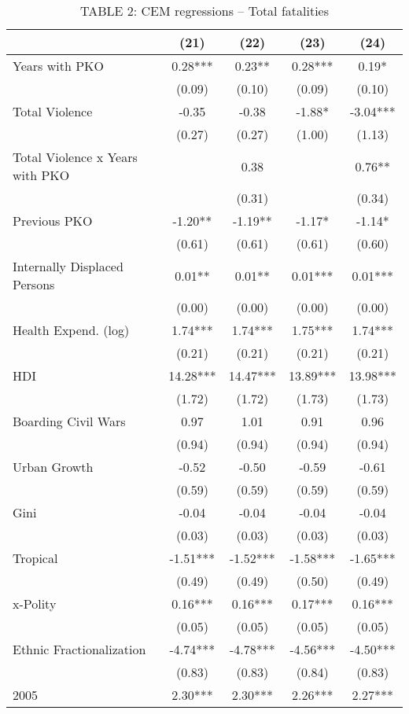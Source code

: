 \begin{table}

\caption{TABLE 2: CEM regressions – Total fatalities}
\centering
\begin{tabular}[t]{lcccc}
\toprule
  & (21) & (22) & (23) & (24)\\
\midrule
Years with PKO & 0.28*** & 0.23** & 0.28*** & 0.19*\\
 & (0.09) & (0.10) & (0.09) & (0.10)\\
Total Violence & -0.35 & -0.38 & -1.88* & -3.04***\\
 & (0.27) & (0.27) & (1.00) & (1.13)\\
Total Violence x Years with PKO &  & 0.38 &  & 0.76**\\
 &  & (0.31) &  & (0.34)\\
Previous PKO & -1.20** & -1.19** & -1.17* & -1.14*\\
 & (0.61) & (0.61) & (0.61) & (0.60)\\
Internally Displaced Persons & 0.01** & 0.01** & 0.01*** & 0.01***\\
 & (0.00) & (0.00) & (0.00) & (0.00)\\
Health Expend. (log) & 1.74*** & 1.74*** & 1.75*** & 1.74***\\
 & (0.21) & (0.21) & (0.21) & (0.21)\\
HDI & 14.28*** & 14.47*** & 13.89*** & 13.98***\\
 & (1.72) & (1.72) & (1.73) & (1.73)\\
Boarding Civil Wars & 0.97 & 1.01 & 0.91 & 0.96\\
 & (0.94) & (0.94) & (0.94) & (0.94)\\
Urban Growth & -0.52 & -0.50 & -0.59 & -0.61\\
 & (0.59) & (0.59) & (0.59) & (0.59)\\
Gini & -0.04 & -0.04 & -0.04 & -0.04\\
 & (0.03) & (0.03) & (0.03) & (0.03)\\
Tropical & -1.51*** & -1.52*** & -1.58*** & -1.65***\\
 & (0.49) & (0.49) & (0.50) & (0.49)\\
x-Polity & 0.16*** & 0.16*** & 0.17*** & 0.16***\\
 & (0.05) & (0.05) & (0.05) & (0.05)\\
Ethnic Fractionalization & -4.74*** & -4.78*** & -4.56*** & -4.50***\\
 & (0.83) & (0.83) & (0.84) & (0.83)\\
2005 & 2.30*** & 2.30*** & 2.26*** & 2.27***\\

\end{tabular}
\end{table}
